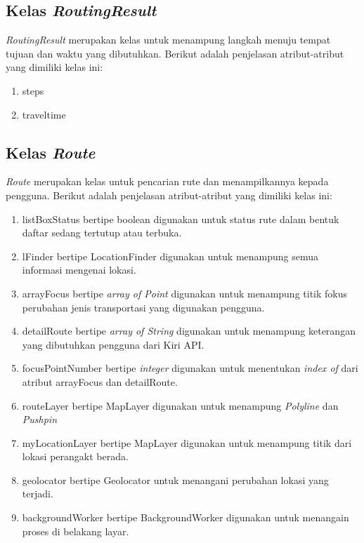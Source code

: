 \subsection{Kelas \textit{RoutingResult}}
\label{lab:Kelas RoutingResult}
\hspace{0.5cm} \textit{RoutingResult} merupakan kelas untuk menampung langkah menuju tempat tujuan dan waktu yang dibutuhkan. Berikut adalah penjelasan atribut-atribut yang dimiliki kelas ini:
\begin{enumerate}
	\item steps
	\item traveltime
\end{enumerate}

\subsection{Kelas \textit{Route}}
\label{lab:Kelas Route}
\hspace{0.5cm} \textit{Route} merupakan kelas untuk pencarian rute dan menampilkannya kepada pengguna. Berikut adalah penjelasan atribut-atribut yang dimiliki kelas ini:
\begin{enumerate}
	\item listBoxStatus bertipe boolean digunakan untuk status rute dalam bentuk daftar sedang tertutup atau terbuka. 
	\item lFinder bertipe LocationFinder digunakan untuk menampung semua informasi mengenai lokasi.
	\item arrayFocus bertipe \textit{array of Point} digunakan untuk menampung titik fokus perubahan jenis transportasi yang digunakan pengguna.  
	\item detailRoute bertipe \textit{array of String} digunakan untuk menampung keterangan yang dibutuhkan pengguna dari Kiri API.
	\item focusPointNumber bertipe \textit{integer} digunakan untuk menentukan \textit{index of} dari atribut arrayFocus dan detailRoute.
	\item routeLayer bertipe MapLayer digunakan untuk menampung \textit{Polyline} dan \textit{Pushpin}
	\item myLocationLayer bertipe MapLayer digunakan untuk menampung titik dari lokasi perangakt berada.
	\item geolocator bertipe Geolocator untuk menangani perubahan lokasi yang terjadi.
	\item backgroundWorker bertipe BackgroundWorker digunakan untuk menangain proses di belakang layar.
\end{enumerate}


